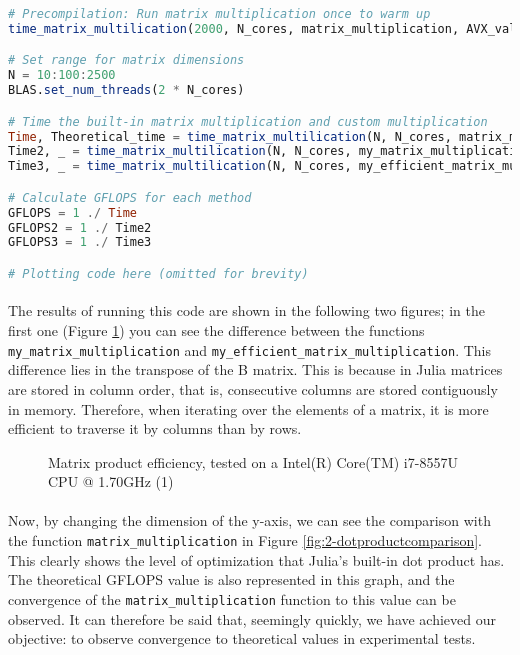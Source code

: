 \begin{lstlisting}[language=Julia]
# Precompilation: Run matrix multiplication once to warm up
time_matrix_multilication(2000, N_cores, matrix_multiplication, AVX_value)

# Set range for matrix dimensions
N = 10:100:2500
BLAS.set_num_threads(2 * N_cores)

# Time the built-in matrix multiplication and custom multiplication
Time, Theoretical_time = time_matrix_multilication(N, N_cores, matrix_multiplication, AVX_value)
Time2, _ = time_matrix_multilication(N, N_cores, my_matrix_multiplication, AVX_value)
Time3, _ = time_matrix_multilication(N, N_cores, my_efficient_matrix_multiplication, AVX_value)

# Calculate GFLOPS for each method
GFLOPS = 1 ./ Time
GFLOPS2 = 1 ./ Time2
GFLOPS3 = 1 ./ Time3

# Plotting code here (omitted for brevity)
\end{lstlisting}

\vspace*{1cm}

\paragraph{} The results of running this code are shown in the following two figures; in the first one (Figure \ref{fig:1-dotproductcomparison}) you can see the difference between the functions \texttt{my\_matrix\_multiplication} and 
\texttt{my\_efficient\_matrix\_multiplication}. This difference lies in the transpose of the B matrix. 
This is because in Julia matrices are stored in column order, that is, consecutive columns are stored 
contiguously in memory. Therefore, when iterating over the elements of a matrix, it is more efficient 
to traverse it by columns than by rows.

\begin{figure}[h]
     \begin{center}
         
     \end{center}
     \caption{Matrix product efficiency, tested on a Intel(R) Core(TM) i7-8557U CPU @ 1.70GHz (1)}
     \label{fig:1-dotproductcomparison}
 \end{figure}
 

\paragraph{} Now, by changing the dimension of the y-axis, we can see the comparison with the function \texttt{matrix\_multiplication} 
in Figure \ref{fig:2-dotproductcomparison}. This clearly shows the level of optimization that Julia's built-in dot product has. 
The theoretical GFLOPS value is also represented in this graph, and the convergence of the \texttt{matrix\_multiplication} function to 
this value can be observed. It can therefore be said that, seemingly quickly, we have achieved our objective: to observe 
convergence to theoretical values in experimental tests.

